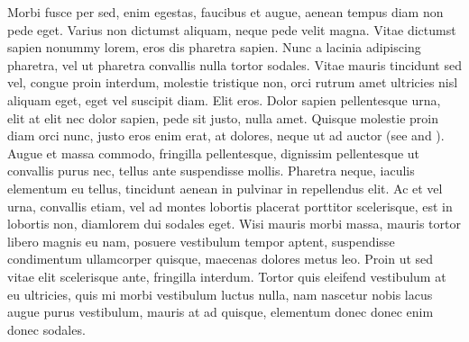 \documentclass[12pt]{article}
\begin{document}
Morbi fusce per sed, enim egestas, faucibus et augue, aenean tempus diam non pede eget. Varius non dictumst aliquam, neque pede velit magna. Vitae dictumst sapien nonummy lorem, eros dis pharetra sapien. Nunc a lacinia adipiscing pharetra, vel ut pharetra convallis nulla tortor sodales. Vitae mauris tincidunt sed vel, congue proin interdum, molestie tristique non, orci rutrum amet ultricies nisl aliquam eget, eget vel suscipit diam. Elit eros. Dolor sapien pellentesque urna, elit at elit nec dolor sapien, pede sit justo, nulla amet. Quisque molestie proin diam orci nunc, justo eros enim erat, at dolores, neque ut ad auctor (see \cite{S} and \cite{H}).
Augue et massa commodo, fringilla pellentesque, dignissim pellentesque ut convallis purus nec, tellus ante suspendisse mollis. Pharetra neque, iaculis elementum eu tellus, tincidunt aenean in pulvinar in repellendus elit. Ac et vel urna, convallis etiam, vel ad montes lobortis placerat porttitor scelerisque, est in lobortis non, diamlorem dui sodales eget. Wisi mauris morbi massa, mauris tortor libero magnis eu nam, posuere vestibulum tempor aptent, suspendisse condimentum ullamcorper quisque, maecenas dolores metus leo. Proin ut sed vitae elit scelerisque ante, fringilla interdum. Tortor quis eleifend vestibulum at eu ultricies, quis mi morbi vestibulum luctus nulla, nam nascetur nobis lacus augue purus vestibulum, mauris at ad quisque, elementum donec donec enim donec sodales.
\end{document}
